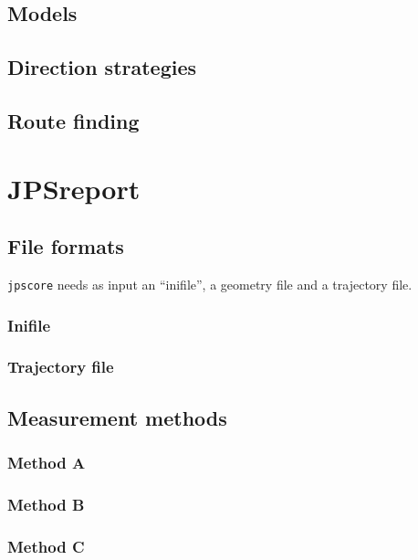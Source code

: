 \documentclass[%
paper=A4,					%
twoside=true,				%
openright,					%
parskip=full,				%
chapterprefix=true,			%
11pt,						%
headings=normal,			%
bibliography=totoc,			%
listof=totoc,				%
titlepage=on,				%
captions=tableabove,		%
draft=false,				%
]{scrreprt}%
\begin{document}
\section{Models}

\newpage
\section{Direction strategies}

\newpage
\section{Route finding}

\chapter{JPSreport}
\section{File formats}
\texttt{jpscore} needs as input an ``inifile'', a geometry file and a trajectory file.

\subsection{Inifile}

\newpage
\subsection{Trajectory file}

\newpage
\section{Measurement methods}
\subsection{Method A}

\newpage
\subsection{Method B}

\newpage
\subsection{Method C}

\newpage
\end{document}
